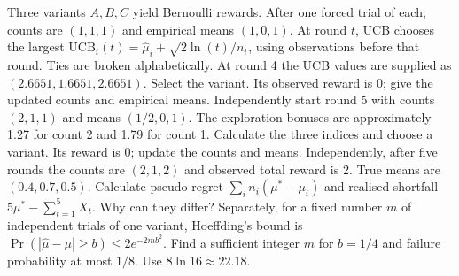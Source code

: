 \documentclass[10pt,a4paper,twocolumn]{article}
\begin{document}

Three variants $A,B,C$ yield Bernoulli rewards. After one forced trial of each, counts are $(1,1,1)$ and empirical means $(1,0,1)$. At round $t$, UCB chooses the largest $\mathrm{UCB}_i(t)=\hat\mu_i+\sqrt{2\ln(t)/n_i}$, using observations before that round. Ties are broken alphabetically.
 At round 4 the UCB values are supplied as $(2.6651,1.6651,2.6651)$. Select the variant. Its observed reward is 0; give the updated counts and empirical means.
 Independently start round 5 with counts $(2,1,1)$ and means $(1/2,0,1)$. The exploration bonuses are approximately 1.27 for count 2 and 1.79 for count 1. Calculate the three indices and choose a variant. Its reward is 0; update the counts and means.
 Independently, after five rounds the counts are $(2,1,2)$ and observed total reward is 2. True means are $(0.4,0.7,0.5)$. Calculate pseudo-regret $\sum_i n_i(\mu^*-\mu_i)$ and realised shortfall $5\mu^*-\sum_{t=1}^5 X_t$. Why can they differ?
 Separately, for a fixed number $m$ of independent trials of one variant, Hoeffding's bound is $\Pr(|\hat\mu-\mu|\ge b)\le2e^{-2mb^2}$. Find a sufficient integer $m$ for $b=1/4$ and failure probability at most $1/8$. Use $8\ln16\approx22.18$.
\end{document}
